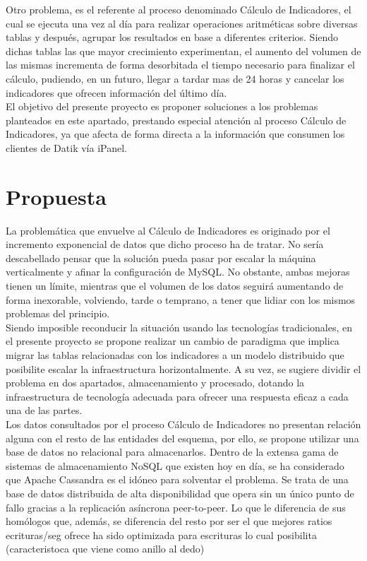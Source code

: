 Otro problema, es el referente al proceso denominado Cálculo de Indicadores, el cual se ejecuta una vez al día para realizar operaciones aritméticas sobre diversas tablas y después, agrupar los resultados en base a diferentes criterios. Siendo dichas tablas las que mayor crecimiento experimentan, el aumento del volumen de las mismas incrementa de forma desorbitada el tiempo necesario para finalizar el cálculo, pudiendo, en un futuro, llegar a tardar mas de 24 horas y cancelar los indicadores que ofrecen información del último día.\\

El objetivo del presente proyecto es proponer soluciones a los problemas planteados en este apartado, prestando especial atención al proceso Cálculo de Indicadores, ya que afecta de forma directa a la información que consumen los clientes de Datik vía iPanel.\\

\section{Propuesta}

La problemática que envuelve al Cálculo de Indicadores es originado por el incremento exponencial de datos que dicho proceso ha de tratar. No sería descabellado pensar que la solución pueda pasar por escalar la máquina verticalmente y afinar la configuración de MySQL. No obstante, ambas mejoras tienen un límite, mientras que el volumen de los datos seguirá aumentando de forma inexorable, volviendo, tarde o temprano, a tener que lidiar con los mismos problemas del principio.\\

Siendo imposible reconducir la situación usando las tecnologías tradicionales, en el presente proyecto se propone realizar un cambio de paradigma que implica migrar las tablas relacionadas con los indicadores a un modelo distribuido que posibilite escalar la infraestructura horizontalmente. A su vez, se sugiere dividir el problema en dos apartados, almacenamiento y procesado, dotando la infraestructura de tecnología adecuada para ofrecer una respuesta eficaz a cada una de las partes.\\

Los datos consultados por el proceso Cálculo de Indicadores no presentan relación alguna con el resto de las entidades del esquema, por ello, se propone utilizar una base de datos no relacional para almacenarlos. Dentro de la extensa gama de sistemas de almacenamiento NoSQL que existen hoy en día, se ha considerado que Apache Cassandra \cite{lakshman2010cassandra} es el idóneo para solventar el problema. Se trata de una base de datos distribuida de alta disponibilidad que opera sin un único punto de fallo gracias a la replicación asíncrona peer-to-peer. Lo que le diferencia de sus homólogos que, además, se diferencia del resto por ser el que mejores ratios ecrituras/seg ofrece ha sido optimizada para  escrituras lo cual posibilita  (caracteristoca que viene como anillo al dedo)



